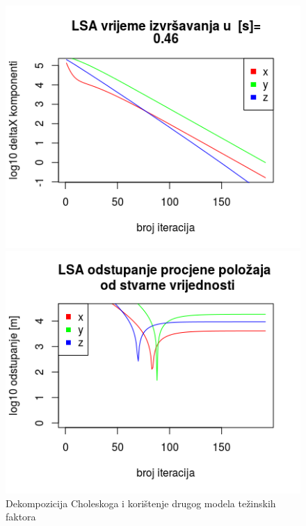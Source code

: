 \documentclass[a4paper,twoside,12pt]{memoir} %
\begin{document}
\begin{figure}[H]
	\begin{minipage}{0.48\textwidth}
		\centering
		\includegraphics[width=1\textwidth]{3LSAdelta2l10b}
	\end{minipage}%
	\hspace{1cm}
	\begin{minipage}{0.48\textwidth}
		
		\includegraphics[width=1\textwidth]{3LSAreal2l10b}
	\end{minipage}%
	\caption{Dekompozicija Choleskoga i korištenje drugog modela težinskih faktora}
	\label{fig:3LSA2Ch}
\end{figure}
\end{document}
